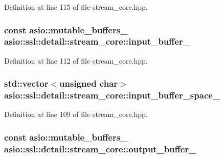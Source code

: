 Definition at line 115 of file stream\+\_\+core.\+hpp.

\hypertarget{structasio_1_1ssl_1_1detail_1_1stream__core_ad51277563d8b30a11995c413ca88efa1}{}
\subsubsection[{input\+\_\+buffer\+\_\+}]{\setlength{\rightskip}{0pt plus 5cm}const {\bf asio\+::mutable\+\_\+buffers\+\_} asio\+::ssl\+::detail\+::stream\+\_\+core\+::input\+\_\+buffer\+\_\+}\label{structasio_1_1ssl_1_1detail_1_1stream__core_ad51277563d8b30a11995c413ca88efa1}


Definition at line 112 of file stream\+\_\+core.\+hpp.

\hypertarget{structasio_1_1ssl_1_1detail_1_1stream__core_af21606076df39a3a112f72b2179ee2ac}{}
\subsubsection[{input\+\_\+buffer\+\_\+space\+\_\+}]{\setlength{\rightskip}{0pt plus 5cm}std\+::vector$<$unsigned char$>$ asio\+::ssl\+::detail\+::stream\+\_\+core\+::input\+\_\+buffer\+\_\+space\+\_\+}\label{structasio_1_1ssl_1_1detail_1_1stream__core_af21606076df39a3a112f72b2179ee2ac}


Definition at line 109 of file stream\+\_\+core.\+hpp.

\hypertarget{structasio_1_1ssl_1_1detail_1_1stream__core_af659b52dd531c1d4434a77a3dad4b5d6}{}
\subsubsection[{output\+\_\+buffer\+\_\+}]{\setlength{\rightskip}{0pt plus 5cm}const {\bf asio\+::mutable\+\_\+buffers\+\_} asio\+::ssl\+::detail\+::stream\+\_\+core\+::output\+\_\+buffer\+\_\+}\label{structasio_1_1ssl_1_1detail_1_1stream__core_af659b52dd531c1d4434a77a3dad4b5d6}


